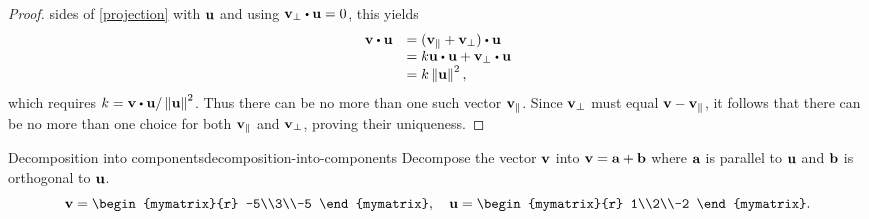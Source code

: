 \begin{proof}
  sides of {\eqref{projection}} with $\mbox{\bf u}$ and using
  $\vect{v}_{\bot }\dotprod \vect{u}=0$, this yields
  \begin{equation*}
    \begin{array}{ll}
      \vect{v}\dotprod \vect{u} & = ( \vect{v}_{\coll}+\vect{v}_{\bot }) \dotprod \vect{u} \\
                                & =  k\vect{u} \dotprod \vect{u} + \vect{v}_{\bot} \dotprod \vect{u} \\
                                & = k \norm{\vect{u}} ^{2},
    \end{array}
  \end{equation*}
  which requires
  $k =\vect{v}\dotprod \vect{u} / \norm{\vect{u}} ^{2}$.  Thus there
  can be no more than one such vector $\mbox{\bf v}_{\|}$. Since
  $\mbox{\bf v}_{\bot}$ must equal $\mbox{\bf v}-\mbox{\bf v}_{\|}$, it follows
  that there can be no more than one choice for both
  $\mbox{\bf v}_{\|}$ and $\mbox{\bf v}_{\bot}$, proving their uniqueness.
\end{proof}

\begin{example}{Decomposition into components}{decomposition-into-components}
  Decompose the vector $\mbox{\bf v}$ into $\mbox{\bf v}=\mbox{\bf a}+\mbox{\bf b}$
  where $\mbox{\bf a}$ is parallel to $\mbox{\bf u}$ and $\mbox{\bf b}$ is
  orthogonal to $\mbox{\bf u}$.
  \begin{equation*}
    \vect{v} = \begin{mymatrix}{r} -5\\3\\-5 \end{mymatrix},\quad
    \vect{u} = \begin{mymatrix}{r} 1\\2\\-2 \end{mymatrix}.
  \end{equation*}
\end{example}

